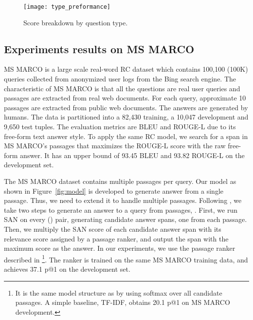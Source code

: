 \documentclass[11pt,a4paper]{article}
\begin{document}
\begin{figure}[t!]
\centering
\texttt{[image: type\_preformance]}
\caption{\label{fig:dev_f1}Score breakdown by question type.}
\end{figure}

\subsection{Experiments results on MS MARCO}
MS MARCO \cite{nguyen2016ms} is a large scale real-word RC dataset which contains 100,100 (100K) queries collected from anonymized user logs from the Bing search engine. The characteristic of MS MARCO is that  all the questions are real user queries and passages are extracted from real web documents. For each query, approximate 10 passages are extracted from public web documents. The answers are generated by humans. The data is partitioned into a 82,430 training, a 10,047 development and 9,650 test tuples. The evaluation metrics are BLEU\cite{papineni2002bleu} and ROUGE-L \cite{lin2004rouge} due to its free-form text answer style. To apply the same RC model, we search for a span in MS MARCO's passages that maximizes the ROUGE-L score with the raw free-form answer. It has an upper bound of 93.45 BLEU and 93.82 ROUGE-L on the development set. 

The MS MARCO dataset contains multiple passages per query. Our model as shown in Figure~\ref{fig:model} is developed to generate answer from a single passage. Thus, we need to extend it to handle multiple passages. Following \cite{shen2017empirical}, we take two steps to generate an answer to a query  from  passages, . First, we run SAN on every () pair, generating  candidate answer spans, one from each passage. Then, we multiply the SAN score of each candidate answer span with its relevance score  assigned by a passage ranker, and output the span with the maximum score as the answer. In our experiments, we use the passage ranker described in \cite{liu2018stochastic}\footnote{It is the same model structure as \cite{liu2018stochastic} by using softmax over all candidate passages. A simple baseline, TF-IDF, obtains 20.1 p@1 on MS MARCO development.}. The ranker is trained on the same MS MARCO training data, and achieves 37.1 p@1 on the development set.
\end{document}
